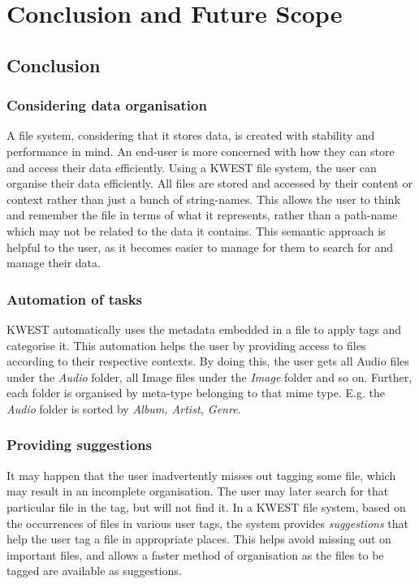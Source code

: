 \chapter{Conclusion and Future Scope}

\section{Conclusion}

\subsection*{Considering data organisation}
A file system, considering that it stores data, is created with stability and performance in mind. An end-user is more concerned with how they can store and access their data efficiently. Using a KWEST file system, the user can organise their data efficiently. All files are stored and accessed by their content or context rather than just a bunch of string-names. This allows the user to think and remember the file in terms of what it represents, rather than a path-name which may not be related to the data it contains. This semantic approach is helpful to the user, as it becomes easier to manage for them to search for and manage their data.

\subsection*{Automation of tasks}
KWEST automatically uses the metadata embedded in a file to apply tags and categorise it. This automation helps the user by providing access to files according to their respective contexts. By doing this, the user gets all Audio files under the \textit{Audio} folder, all Image files under the \textit{Image} folder and so on. Further, each folder is organised by meta-type belonging to that mime type. E.g. the \textit{Audio} folder is sorted by \textit{Album, Artist, Genre}.

\subsection*{Providing suggestions}
It may happen that the user inadvertently misses out tagging some file, which may result in an incomplete organisation. The user may later search for that particular file in the tag, but will not find it. In a KWEST file system, based on the occurrences of files in various user tags, the system provides \textit{suggestions} that help the user tag a file in appropriate places. This helps avoid missing out on important files, and allows a faster method of organisation as the files to be tagged are available as suggestions.

